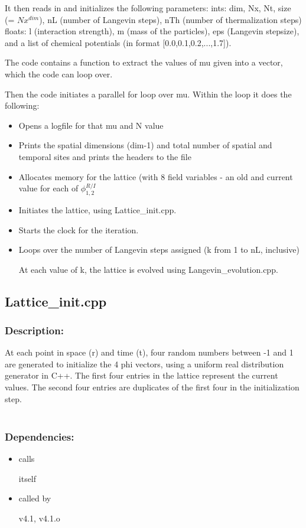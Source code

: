 
It then reads in and initializes the following parameters:
ints: dim, Nx, Nt, size (= $Nx^{dim}$), nL (number of Langevin steps), nTh (number of thermalization steps)
floats: l (interaction strength), m (mass of the particles), eps (Langevin stepsize), and a list of chemical potentials (in format [0.0,0.1,0.2,...,1.7]). 

The code contains a function to extract the values of mu given into a vector, which the code can loop over.

Then the code initiates a parallel for loop over mu. Within the loop it does the following:
\begin{itemize}
	\item Opens a logfile for that mu and N value
	\item Prints the spatial dimensions (dim-1) and total number of spatial and temporal sites and prints the headers to the file
	\item Allocates memory for the lattice (with 8 field variables - an old and current value for each of $\phi_{1,2}^{R/I}$
	\item  Initiates the lattice, using Lattice\_init.cpp.

	\item Starts the clock for the iteration.

	\item Loops over the number of Langevin steps assigned (k from 1 to nL, inclusive)
	
	At each value of k, the lattice is evolved using Langevin\_evolution.cpp.
\end{itemize}
\subsection{Lattice\_init.cpp}
\subsubsection{Description:}
At each point in space (r) and time (t), four random numbers between -1 and 1
are generated to initialize the 4 phi vectors, using a uniform real distribution generator in C++. The first four entries in the lattice represent the current values. The second four entries are duplicates of the first four in the initialization step.\\
\\
\subsubsection{Dependencies:}
\begin{itemize}
\item calls 

itself

\item called by

v4.1, v4.1.o

\end{itemize}

